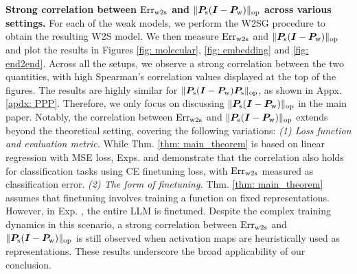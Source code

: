 \textbf{Strong correlation between $\text{Err}_{\text{w2s}}$ and $\lVert  {\bm{P}}_{\text{s}}({\bm{I}}-{\bm{P}}_{\text{w}})  \rVert_{\mathrm{op}}$ across various settings.}   For each of the weak models, we perform the W2SG procedure to obtain the resulting W2S model. We then measure $\text{Err}_{\text{w2s}}$ and $\lVert  {\bm{P}}_{\text{s}}({\bm{I}}-{\bm{P}}_{\text{w}})  \rVert_{\mathrm{op}}$ and plot the results in Figures \ref{fig: molecular}, \ref{fig: embedding} and \ref{fig: end2end}. Across all the setups, we observe a strong correlation between the two quantities, with high Spearman's correlation values displayed at the top of the figures. The results are highly similar for $\lVert  {\bm{P}}_{\text{s}}({\bm{I}}-{\bm{P}}_{\text{w}}) {\bm{P}}_{\text{s}} \rVert_{\mathrm{op}}$, as shown in Appx. \ref{apdx: PPP}. Therefore, we only focus on discussing $\lVert  {\bm{P}}_{\text{s}}({\bm{I}}-{\bm{P}}_{\text{w}})  \rVert_{\mathrm{op}}$ in the main paper. {Notably, the correlation between $\text{Err}_{\text{w2s}}$ and $\lVert  {\bm{P}}_{\text{s}}({\bm{I}}-{\bm{P}}_{\text{w}})  \rVert_{\mathrm{op}}$  extends beyond the theoretical setting, covering the following variations: \emph{(1) Loss function and evaluation metric.} While Thm. \ref{thm: main_theorem} is based on linear regression with MSE loss, Exps.  and  demonstrate that the correlation also holds for classification tasks using CE finetuning loss, with $\text{Err}_{\text{w2s}}$ measured as classification error. \emph{(2) The form of finetuning.} Thm. \ref{thm: main_theorem} assumes that finetuning involves training a function on fixed representations. However, in Exp. , the entire LLM is finetuned. Despite the complex training dynamics in this scenario, a strong correlation between $\text{Err}_{\text{w2s}}$ and $\lVert {\bm{P}}_{\text{s}}({\bm{I}}-{\bm{P}}_{\text{w}}) \rVert_{\mathrm{op}}$ is still observed when activation maps are heuristically used as representations. These results underscore the broad applicability of our conclusion.} 

